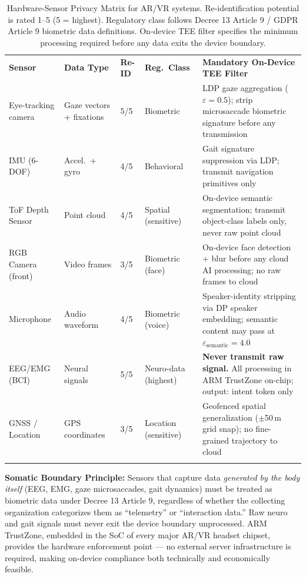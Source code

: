 \begin{table}[ht]
\centering
\caption{Hardware-Sensor Privacy Matrix for AR/VR systems. Re-identification potential is rated 1--5 (5 = highest). Regulatory class follows Decree 13 Article 9 / GDPR Article 9 biometric data definitions. On-device TEE filter specifies the minimum processing required before any data exits the device boundary.}
\label{tab:sensor_privacy_matrix}
\renewcommand{\arraystretch}{1.3}
\begin{tabular}{p{2.0cm} p{1.8cm} p{1.2cm} p{1.8cm} p{4.9cm}}
\hline\noalign{\smallskip}
\textbf{Sensor} & \textbf{Data Type} & \textbf{Re-ID} & \textbf{Reg.\ Class} & \textbf{Mandatory On-Device TEE Filter} \\
\noalign{\smallskip}\svhline\noalign{\smallskip}
Eye-tracking camera & Gaze vectors + fixations & \cellcolor{costhigh}5/5 & Biometric & LDP gaze aggregation ($\varepsilon{=}0.5$); strip microsaccade biometric signature before any transmission \\[3pt]
IMU (6-DOF) & Accel.\ + gyro & \cellcolor{costhigh}4/5 & Behavioral & Gait signature suppression via LDP; transmit navigation primitives only \\[3pt]
ToF Depth Sensor & Point cloud & \cellcolor{costhigh}4/5 & Spatial (sensitive) & On-device semantic segmentation; transmit object-class labels only, never raw point cloud \\[3pt]
RGB Camera (front) & Video frames & \cellcolor{costmed}3/5 & Biometric (face) & On-device face detection + blur before any cloud AI processing; no raw frames to cloud \\[3pt]
Microphone & Audio waveform & \cellcolor{costhigh}4/5 & Biometric (voice) & Speaker-identity stripping via DP speaker embedding; semantic content may pass at $\varepsilon_{\mathrm{semantic}}{=}4.0$ \\[3pt]
EEG/EMG (BCI) & Neural signals & \cellcolor{costvhigh}5/5 & Neuro-data (highest) & \textbf{Never transmit raw signal.} All processing in ARM TrustZone on-chip; output: intent token only \\[3pt]
\rowcolor{patternbg}
GNSS / Location & GPS coordinates & \cellcolor{costmed}3/5 & Location (sensitive) & Geofenced spatial generalization ($\pm$50\,m grid snap); no fine-grained trajectory to cloud \\
\noalign{\smallskip}\hline\noalign{\smallskip}
\end{tabular}
\end{table}

\begin{svgraybox}
\textbf{Somatic Boundary Principle:} Sensors that capture data \emph{generated by the body itself} (EEG, EMG, gaze microsaccades, gait dynamics) must be treated as biometric data under Decree 13 Article 9, regardless of whether the collecting organization categorizes them as ``telemetry'' or ``interaction data.'' Raw neuro and gait signals must never exit the device boundary unprocessed. ARM TrustZone, embedded in the SoC of every major AR/VR headset chipset, provides the hardware enforcement point --- no external server infrastructure is required, making on-device compliance both technically and economically feasible.
\end{svgraybox}

